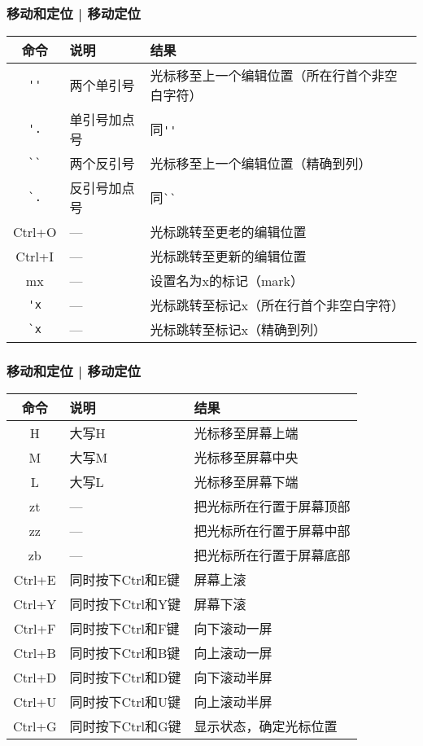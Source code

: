 \begin{frame}[fragile]
  \frametitle{移动和定位 | 移动定位}
  \begin{table}
    \centering
    \begin{tabularx}{\textwidth}{clX}
      \hline
      \rowcolor{blue!50}命令 & 说明 & 结果\\
      \hline
      \verb|''| & 两个单引号 & 光标移至上一个编辑位置\small{（所在行首个非空白字符）}\\
      \verb|'.| & 单引号加点号 & 同\verb|''|\\
      \verb|``| & 两个反引号 & 光标移至上一个编辑位置\small{（精确到列）}\\
      \verb|`.| & 反引号加点号 & 同\verb|``|\\
      \hline
      Ctrl+O & --- & 光标跳转至更老的编辑位置\\
      Ctrl+I & --- & 光标跳转至更新的编辑位置\\
      \hline
      mx & --- & 设置名为x的标记（mark）\\
      \verb|'x| & --- & 光标跳转至标记x\small{（所在行首个非空白字符）}\\
      \verb|`x| & --- & 光标跳转至标记x\small{（精确到列）}\\
      \hline
    \end{tabularx}
  \end{table}
\end{frame}

\begin{frame}[fragile]
  \frametitle{移动和定位 | 移动定位}
  \begin{table}
    \centering
    \begin{tabularx}{0.9\textwidth}{clX}
      \hline
      \rowcolor{blue!50}命令 & 说明 & 结果\\
      \hline
      H & 大写H & 光标移至屏幕上端\\
      M & 大写M & 光标移至屏幕中央\\
      L & 大写L & 光标移至屏幕下端\\
      \hline
      zt & --- & 把光标所在行置于屏幕顶部\\
      zz & --- & 把光标所在行置于屏幕中部\\
      zb & --- & 把光标所在行置于屏幕底部\\
      \hline
      Ctrl+E & 同时按下Ctrl和E键 & 屏幕上滚\\
      Ctrl+Y & 同时按下Ctrl和Y键 & 屏幕下滚\\
      \hline
      Ctrl+F & 同时按下Ctrl和F键 & 向下滚动一屏\\
      Ctrl+B & 同时按下Ctrl和B键 & 向上滚动一屏\\
      Ctrl+D & 同时按下Ctrl和D键 & 向下滚动半屏\\
      Ctrl+U & 同时按下Ctrl和U键 & 向上滚动半屏\\
      \hline
      Ctrl+G & 同时按下Ctrl和G键 & 显示状态，确定光标位置\\
      \hline
    \end{tabularx}
  \end{table}
\end{frame}

